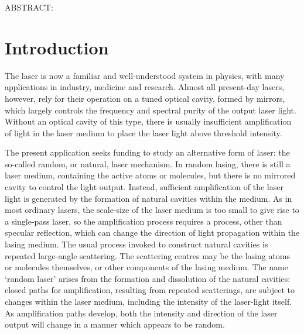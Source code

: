 
ABSTRACT:


\section{Introduction}

The laser is now a familiar and well-understood system in physics, with many
applications in industry, medicine and research. Almost all
present-day lasers,
however, rely for their operation on a tuned optical cavity, formed by
mirrors, which largely controls the frequency and spectral purity of the
output laser light. Without an optical cavity of this type, there is usually
insufficient amplification of light in the laser medium to place the laser
light above threshold intensity.

The present application seeks funding to study an alternative form of laser:
the so-called random, or natural, laser mechanism. In random lasing, there
is still a laser medium, containing the active atoms or molecules, but
there is no mirrored cavity to control the light output. Instead, sufficient
amplification of the laser light is generated by the formation of natural
cavities within the medium. As in most ordinary lasers, the scale-size of
the laser medium is too small to give rise to a single-pass laser, so the
amplification process requires a process, other than specular reflection,
which can change the direction of light propagation within the lasing
medium. The usual process invoked to construct natural cavities is repeated
large-angle scattering. The scattering centres may be the lasing atoms or
molecules themselves, or other components of the lasing medium. The name
`random laser' arises from the formation and dissolution of the natural
cavities: closed paths for amplification, resulting from repeated scatterings,
are subject to changes within the laser medium, including the intensity of
the laser-light itself. As amplification paths develop, both the intensity
and direction of the laser output will change in a manner which appears
to be random.

